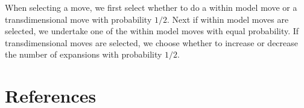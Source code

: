 \documentclass{report}
\theoremstyle{definition}
\begin{document}
When selecting a move, we first select whether to do a within model move or a transdimensional move with probability $1/2$.
Next if within model moves are selected, we undertake one of the within model moves with equal probability. If transdimensional moves are selected, we choose whether to increase or decrease the number of expansions with probability $1/2$.
\chapter{References}
\printbibliography
\end{document}
